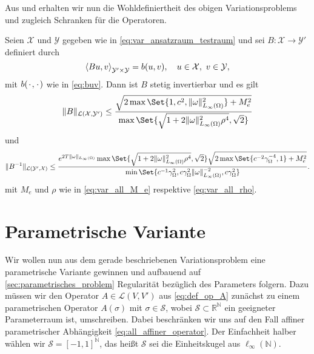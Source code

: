 Aus  und  erhalten wir nun die Wohldefiniertheit des obigen Variationsproblems und zugleich Schranken für die Operatoren.

\begin{Korollar}
\label{korollar:2.2}
    Seien $\mathcal X$ und $\mathcal Y$ gegeben wie in \eqref{eq:var_ansatzraum_testraum} und sei $B \colon \mathcal X \to \mathcal Y'$ definiert durch
    \begin{equation}
        \left\langle Bu,v\right\rangle_{\mathcal Y' \times \mathcal Y}  = b(u, v), \quad u \in \mathcal X,~ v \in \mathcal Y,
    \end{equation}
    mit $b({\mkern2mu\cdot\mkern2mu}, {\mkern2mu\cdot\mkern2mu})$ wie in \eqref{eq:buv}.
    Dann ist $B$ stetig invertierbar und es gilt
    \begin{equation}
        \norm{B}_{\mathcal L(\mathcal X, \mathcal Y')}
        \leq
        \frac{\sqrt{2 \max\Set{1, c^{2}, \norm{\omega}_{L_{\infty}(\Omega)}^{2}} + M_{e}^{2}}}{\max\Set{\sqrt{1 + 2 \norm{\omega}_{L_{\infty}(\Omega)}^{2} \rho^{4}}, \sqrt{2} }}
    \end{equation}
    und
    \begin{equation}
        \norm{B^{-1}}_{\mathcal L( \mathcal Y', \mathcal X)}
        \leq \frac{e^{2 T \norm{\omega}_{L_{\infty}(\Omega)}} \max\Set{\sqrt{1 + 2 \norm{\omega}_{L_{\infty}(\Omega)}^{2} \rho^{4}}, \sqrt{2}} \sqrt{2 \max\Set{c^{-2} \gamma_{\Omega}^{-4}, 1} + M_{e}^{2}}}{\min\Set{c^{-1} \gamma_{\Omega}^{2}, c \gamma_{\Omega}^{2} \norm{\omega}_{L_{\infty}(\Omega)}^{-2}, c \gamma_{\Omega}^{2} }}.
    \end{equation}
    mit $M_{e}$ und $\rho$ wie in \eqref{eq:var_all_M_e} respektive \eqref{eq:var_all_rho}.
\end{Korollar}


\section{Parametrische Variante} %
\label{sec:parametrische_variante}

Wir wollen nun aus dem gerade beschriebenen Variationsproblem eine parametrische Variante gewinnen und aufbauend auf \autoref{sec:parametrisches_problem} Regularität bezüglich des Parameters folgern.
Dazu müssen wir den Operator $A \in \mathcal L(V, V')$ aus \eqref{eq:def_op_A} zunächst zu einem parametrischen Operator $A(\sigma)$ mit $\sigma \in \mathcal S$, wobei $\mathcal S \subset \mathbb{R}^{\mathbb{N}}$ ein geeigneter Parameterraum ist, umschreiben.
Dabei beschränken wir uns auf den Fall affiner parametrischer Abhängigkeit \eqref{eq:all_affiner_operator}.
Der Einfachheit halber wählen wir $\mathcal S = [-1, 1]^{\mathbb{N}}$, das heißt $\mathcal S$ sei die Einheitskugel aus $\ell_{\infty}(\mathbb{N})$.

